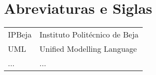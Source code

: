 \chapter{Abreviaturas e Siglas}

\begin{longtable}{p{} p{}} 

IPBeja & Instituto Politécnico de Beja\\
UML & Unified Modelling Language\\
... & ...

\end{longtable}

